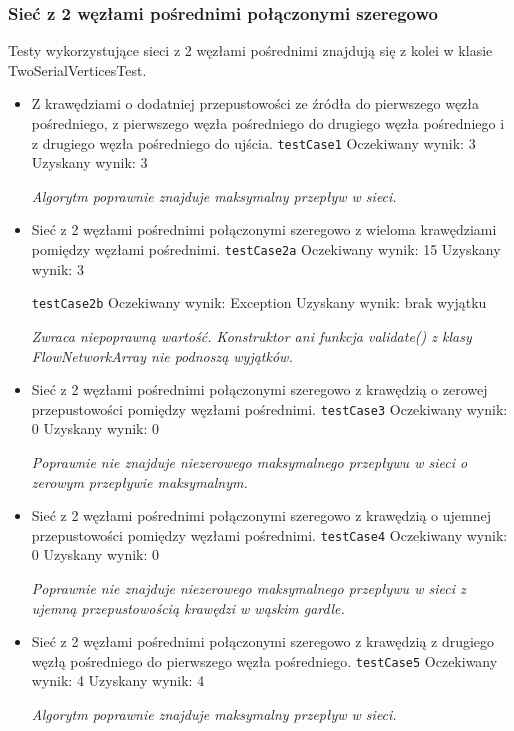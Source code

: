\subsubsection{Sieć z 2 węzłami pośrednimi połączonymi szeregowo}
Testy wykorzystujące sieci z 2 węzłami pośrednimi znajdują się z kolei w klasie
TwoSerialVerticesTest.
\begin{itemize}[nosep]
    \item Z krawędziami o dodatniej przepustowości ze źródła do pierwszego węzła
    pośredniego, z pierwszego węzła pośredniego do drugiego węzła pośredniego i z
    drugiego węzła pośredniego do ujścia.
    \texttt{testCase1}
    Oczekiwany wynik: 3
    Uzyskany wynik: 3

    \emph{Algorytm poprawnie znajduje maksymalny przepływ w sieci.}

    \item Sieć z 2 węzłami pośrednimi połączonymi szeregowo z wieloma
    krawędziami pomiędzy węzłami pośrednimi.
    \texttt{testCase2a}
    Oczekiwany wynik: 15
    Uzyskany wynik: 3

    \texttt{testCase2b}
    Oczekiwany wynik: Exception
    Uzyskany wynik: brak wyjątku

    \emph{Zwraca niepoprawną wartość. Konstruktor ani funkcja validate() z klasy
    FlowNetworkArray nie podnoszą wyjątków.}

    \item Sieć z 2 węzłami pośrednimi połączonymi szeregowo z krawędzią o
    zerowej przepustowości pomiędzy węzłami pośrednimi.
    \texttt{testCase3}
    Oczekiwany wynik: 0
    Uzyskany wynik: 0

    \emph{Poprawnie nie znajduje niezerowego maksymalnego przepływu w sieci
    o zerowym przepływie maksymalnym.}

    \item Sieć z 2 węzłami pośrednimi połączonymi szeregowo z krawędzią o
    ujemnej przepustowości pomiędzy węzłami pośrednimi.
    \texttt{testCase4}
    Oczekiwany wynik: 0
    Uzyskany wynik: 0

    \emph{Poprawnie nie znajduje niezerowego maksymalnego przepływu w sieci
    z ujemną przepustowością krawędzi w wąskim gardle.}

    \item Sieć z 2 węzłami pośrednimi połączonymi szeregowo z krawędzią z
    drugiego węzłą pośredniego do pierwszego węzła pośredniego.
    \texttt{testCase5}
    Oczekiwany wynik: 4
    Uzyskany wynik: 4

    \emph{Algorytm poprawnie znajduje maksymalny przepływ w sieci.}


\end{itemize}
